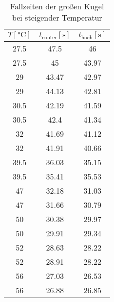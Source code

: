 \begin{table}[!htp]
  \centering
  \begin{tabular}{c|c|c}
    \toprule
    $T [\unit{\degreeCelsius}]$ & $t_{\text{runter}} [\unit{\second}]$ & $t_{\text{hoch}} [\unit{\second}]$\\
    \midrule
    27.5 & 47.5 & 46\\%
    27.5 & 45 & 43.97\\
    29 & 43.47 & 42.97\\
    29 & 44.13 & 42.81\\
    30.5 & 42.19 & 41.59\\
    30.5 & 42.4 & 41.34\\
    32 & 41.69 & 41.12\\
    32 & 41.91 & 40.66\\
    39.5 & 36.03 & 35.15\\
    39.5 & 35.41 & 35.53\\
    47 & 32.18 & 31.03\\
    47 & 31.66 & 30.79\\
    50 & 30.38 & 29.97\\
    50 & 29.91 & 29.34\\
    52 & 28.63 & 28.22\\
    52 & 28.91 & 28.22\\
    56 & 27.03 & 26.53\\
    56 & 26.88 & 26.85\\
    \bottomrule
  \end{tabular}
  \label{tabellegkt}
  \caption{Fallzeiten der großen Kugel bei steigender Temperatur}
\end{table}


